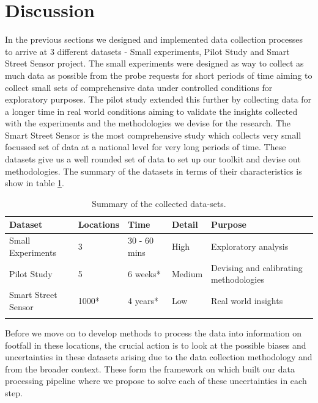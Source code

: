 \section{Discussion}
In the previous sections we designed and implemented data collection processes to arrive at 3 different datasets - Small experiments, Pilot Study and Smart Street Sensor project. 
The small experiments were designed as way to collect as much data as possible from the probe requests for short periods of time aiming to collect small sets of comprehensive data under controlled conditions for exploratory purposes.
The pilot study extended this further by collecting data for a longer time in real world conditions aiming to validate the insights collected with the experiments and the methodologies we devise for the research.
The Smart Street Sensor is the most comprehensive study which collects very small focussed set of data at a national level for very long periods of time.
These datasets give us a well rounded set of data to set up our toolkit and devise out methodologies.
The summary of the datasets in terms of their characteristics is show in table \ref{table:collection:discussion:summary}.

\begin{table}
  \footnotesize
  \begin{center}
    \begin{tabular}{llllp{3cm}}
      \toprule
      Dataset & Locations & Time & Detail & Purpose\\
      \midrule
      \addlinespace[0.1cm]
      Small Experiments & 3 & 30 - 60 mins & High & Exploratory analysis\\
      \addlinespace[0.2cm]
      Pilot Study & 5 & 6 weeks* & Medium & Devising and calibrating methodologies\\
      \addlinespace[0.2cm]
      Smart Street Sensor & 1000* & 4 years* & Low & Real world insights\\
      \addlinespace[0.1cm]
      \bottomrule
    \end{tabular}
  \end{center}
  \caption{Summary of the collected data-sets.}
  \label{table:collection:discussion:summary}
\end{table}

Before we move on to develop methods to process the data into information on footfall in these locations, the crucial action is to look at the possible biases and uncertainties in these datasets arising due to the data collection methodology and from the broader context.
These form the framework on which built our data processing pipeline where we propose to solve each of these uncertainties in each step.

